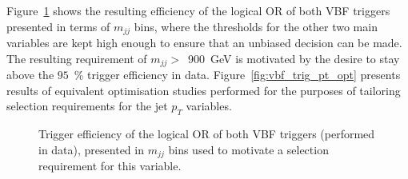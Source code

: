 \hspace{10pt} Figure~\ref{fig:vbf_trig_mjj_opt} shows the resulting efficiency of the logical OR of both VBF triggers presented in terms of $m_{jj}$ bins, where the thresholds for the other two main variables are kept high enough to ensure that an unbiased decision can be made. The resulting requirement of $m_{jj}>$~900~GeV is motivated by the desire to stay above the $95$~\% trigger efficiency in data. Figure~\ref{fig:vbf_trig_pt_opt} presents results of equivalent optimisation studies performed for the purposes of tailoring selection requirements for the jet $p_T$ variables.

\begin{figure}[htbp]
  \centering
\caption{Trigger efficiency of the logical OR of both VBF triggers (performed in data), presented in $m_{jj}$ bins used to motivate a selection requirement for this variable.}
\label{fig:vbf_trig_mjj_opt}
\end{figure}

